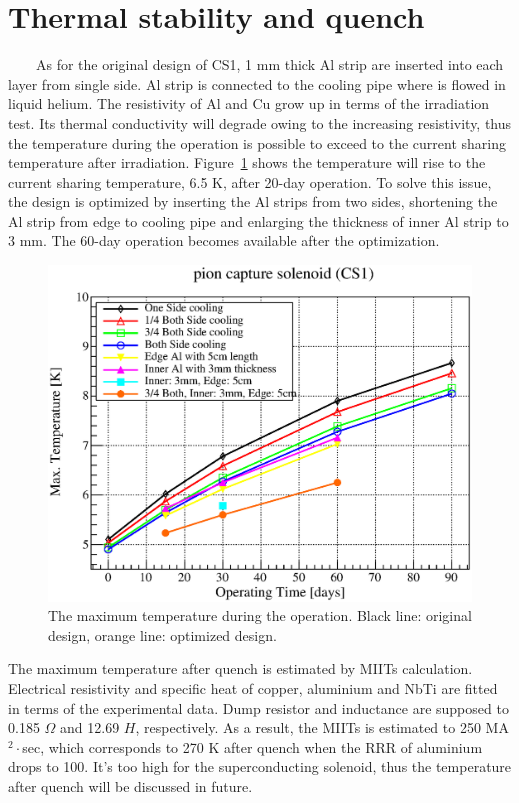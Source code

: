 \documentclass[a4paper, 10pt, twocolumn]{article}
\begin{document}
\section{Thermal stability and quench}
~~~~As for the original design of CS1, 1 mm thick Al strip are inserted into each layer from single side.
Al strip is connected to the cooling pipe where is flowed in liquid helium.
The resistivity of Al and Cu grow up in terms of the irradiation test.
Its thermal conductivity will degrade owing to the increasing resistivity, thus the temperature during the operation is possible to exceed to the current sharing temperature after irradiation.
Figure~\ref{temp} shows the temperature will rise to the current sharing temperature, 6.5 K, after 20-day operation.
To solve this issue, the design is optimized by inserting the Al strips from two sides, shortening the Al strip from edge to cooling pipe and enlarging the thickness of inner Al strip to 3 mm.
The 60-day operation becomes available after the optimization.
\begin{figure}[H]
 \centering
 \includegraphics[scale=0.4]{fig/maxtemp.eps}
 \caption{The maximum temperature during the operation. Black line: original design, orange line: optimized design.}
 \label{temp}
\end{figure}

The maximum temperature after quench is estimated by MIITs calculation.
Electrical resistivity and specific heat of copper, aluminium and NbTi are fitted in terms of the experimental data.
Dump resistor and inductance are supposed to 0.185 $\Omega$ and 12.69 $H$, respectively.
As a result, the MIITs is estimated to 250 MA$^2\cdot$sec, which corresponds to 270 K after quench when the RRR of aluminium drops to 100.
It's too high for the superconducting solenoid, thus the temperature after quench will be discussed in future.
\end{document}
